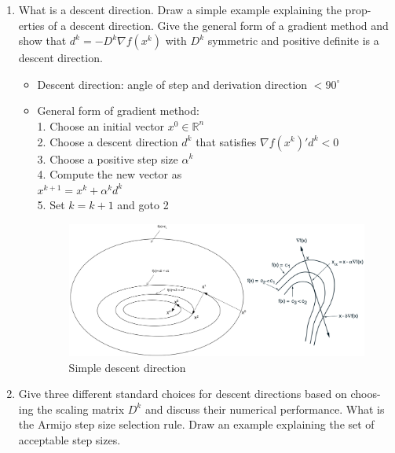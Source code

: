 \documentclass{report}
\newcommand{\question}[1]{{\small\textsf{#1}}}
\begin{document}
\begin{enumerate}
\item \question{What is a descent direction. Draw a simple example explaining the prop- erties of a
    descent direction. Give the general form of a gradient method and show that
    \(d^k = -D^k \nabla f(x^k)\) with \(D^k\) symmetric and positive definite is a descent
    direction.}
  \begin{itemize}
  \item Descent direction: angle of step and derivation direction $< 90^\circ$
  \item General form of gradient method: \\
    1. Choose an initial vector $x ^0 \in \mathbb{R}^n$\\
    2. Choose a descent direction $d^k$ that satisfies $\nabla f (x^k)'  d^k < 0$\\
    3. Choose a positive step size $\alpha^k$\\
    4. Compute the new vector as\\
    $x^{k+1} = x^k + \alpha^k d^k$\\
    5. Set $k = k + 1$ and goto 2

\begin{figure}[H]
  \includegraphics[width=\textwidth]{desc_dir.png}
  \caption{Simple descent direction\label{fig:desc_dir}}
\end{figure}
\end{itemize}

\item \question{Give three different standard choices for descent directions based on choos- ing the
    scaling matrix \(D^k\) and discuss their numerical performance. What is the Armijo step size
    selection rule. Draw an example explaining the set of acceptable step sizes.}


\end{enumerate}
\end{document}
